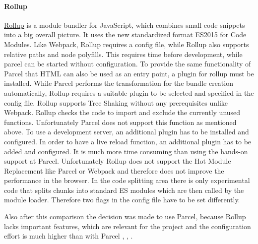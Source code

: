 \paragraph{Rollup}
\label{par:tecRollup}
\href{https://rollupjs.org/guide/en/}{Rollup} is a module bundler for JavaScript, which combines small code snippets into a big overall picture. It uses the new standardized format ES2015 for Code Modules. Like Webpack, Rollup requires a config file, while Rollup also supports relative paths and node polyfills. This requires time before development, while parcel can be started without configuration. To provide the same functionality of Parcel that HTML can also be used as an entry point, a plugin for rollup must be installed. While Parcel performs the transformation for the bundle creation automatically, Rollup requires a suitable plugin to be selected and specified in the config file.  Rollup supports Tree Shaking without any prerequisites unlike Webpack. Rollup checks the code to import and exclude the currently unused functions. Unfortunately Parcel does not support this function as mentioned above. To use a development server, an additional plugin has to be installed and configured. In order to have a live reload function, an additional plugin has to be added and configured. It is much more time consuming than using the hands-on support at Parcel. Unfortunately Rollup does not support the Hot Module Replacement like Parcel or Webpack and therefore does not improve the performance in the browser. In the code splitting area there is only experimental code that splits chunks into standard ES modules which are then called by the module loader. Therefore two flags in the config file have to be set differently.

Also after this comparison the decision was made to use Parcel, because Rollup lacks important features, which are relevant for the project and the configuration effort is much higher than with Parcel \cite{Bhatia2018}, \cite{WebpackAuthors2019}, \cite{rollupJs-Authors2019}. 

